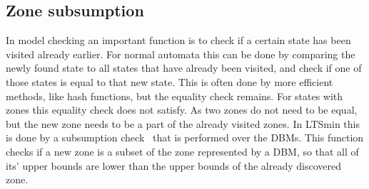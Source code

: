 \subsection{Zone subsumption}
In model checking an important function is to check if a certain state has been visited already earlier. For normal automata this can be done by comparing the newly found state to all states that have already been visited, and check if one of those states is equal to that new state. This is often done by more efficient methods, like hash functions, but the equality check remains. For states with zones this equality check does not satisfy. As two zones do not need to be equal, but the new zone needs to be a part of the already visited zones. In LTSmin this is done by a subsumption check~\cite{eemcs21972} that is performed over the DBMs. This function checks if a new zone is a subset of the zone represented by a DBM, so that all of its' upper bounds are lower than the upper bounds of the already discovered zone.